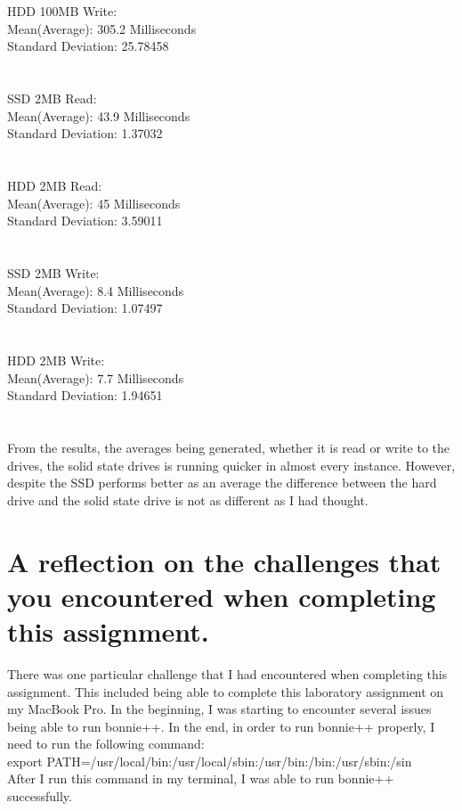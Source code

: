 \documentclass{article}
\begin{document}
\\
\\
HDD 100MB Write:\\
Mean(Average): 305.2 Milliseconds\\
Standard Deviation: 25.78458\\
\\
\\
SSD 2MB Read:\\
Mean(Average): 43.9 Milliseconds\\
Standard Deviation: 1.37032\\
\\
\\
HDD 2MB Read:\\
Mean(Average): 45 Milliseconds\\
Standard Deviation: 3.59011\\
\\
\\
SSD 2MB Write:\\
Mean(Average): 8.4 Milliseconds\\
Standard Deviation: 1.07497\\
\\
\\
HDD 2MB Write:\\
Mean(Average): 7.7 Milliseconds\\
Standard Deviation: 1.94651\\
\\
\\
From the results, the averages being generated, whether it is read or write to the drives, the solid state drives is running quicker in almost every instance. However, despite the SSD performs better as an average the difference between the hard drive and the solid state drive is not as different as I had thought.

\section{A reflection on the challenges that you encountered when completing this assignment.}

There was one particular challenge that I had encountered when completing this assignment. This included being able to complete this laboratory assignment on my MacBook Pro. In the beginning, I was starting to encounter several issues being able to run bonnie++. In the end, in order to run bonnie++ properly, I need to run the following command:
\\
export PATH=/usr/local/bin:/usr/local/sbin:/usr/bin:/bin:/usr/sbin:/sin
\\
After I run this command in my terminal, I was able to run bonnie++ successfully. 
\end{document}
